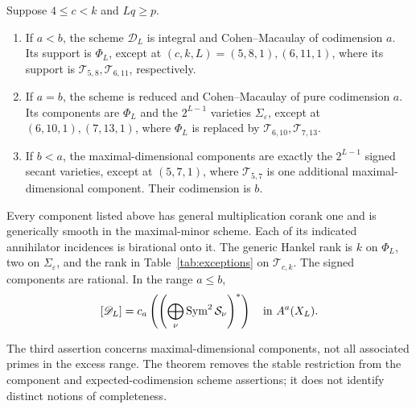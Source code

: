 \begin{theorem}\label{thm:all-dimension}
Suppose $4\le c<k$ and $Lq\ge p$.
\begin{enumerate}
\item If $a<b$, the scheme $\mathscr D_L$ is integral and
Cohen--Macaulay of codimension $a$. Its support is $\Phi_L$, except at
$(c,k,L)=(5,8,1),(6,11,1)$, where its support is
$\mathcal T_{5,8},\mathcal T_{6,11}$, respectively.
\item If $a=b$, the scheme is reduced and Cohen--Macaulay of pure
codimension $a$. Its components are $\Phi_L$ and the $2^{L-1}$
varieties $\Sigma_\varepsilon$, except at $(6,10,1),(7,13,1)$,
where $\Phi_L$ is replaced by $\mathcal T_{6,10},\mathcal T_{7,13}$.
\item If $b<a$, the maximal-dimensional components are exactly the
$2^{L-1}$ signed secant varieties, except at $(5,7,1)$, where
$\mathcal T_{5,7}$ is one additional maximal-dimensional component.
Their codimension is $b$.
\end{enumerate}
Every component listed above has general multiplication corank one and
is generically smooth in the maximal-minor scheme. Each of its indicated
annihilator incidences is birational onto it. The generic Hankel rank is
$k$ on $\Phi_L$, two on $\Sigma_\varepsilon$, and the rank in
Table~\ref{tab:exceptions} on $\mathcal T_{c,k}$.
The signed components are rational. In the range $a\le b$,
\begin{equation}\label{eq:all-dimension-cycle}
 [\mathscr D_L]=c_a\left(\left(\bigoplus_\nu\operatorname{Sym}^2\mathcal S_\nu\right)^*\right)
             \quad\hbox{in }A^a(X_L).
\end{equation}
\end{theorem}
The third assertion concerns maximal-dimensional components, not all
associated primes in the excess range. The theorem removes the stable
restriction from the component and expected-codimension scheme assertions;
it does not identify distinct notions of completeness.

